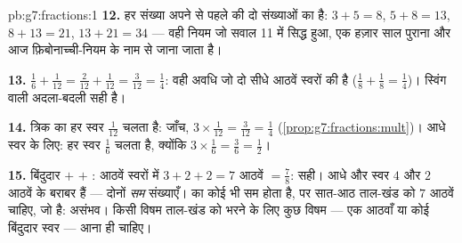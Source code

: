\begin{solution}{pb:g7:fractions:1}
\textbf{12.} हर संख्या अपने से पहले की दो संख्याओं का  है:
$3 + 5 = 8$, $5 + 8 = 13$, $8 + 13 = 21$, $13 + 21 = 34$ --- वही
नियम जो सवाल 11 में सिद्ध हुआ, एक हज़ार साल पुराना और आज
फ़िबोनाच्ची-नियम के नाम से जाना जाता है।

\textbf{13.} $\frac16 + \frac{1}{12} = \frac{2}{12} +
\frac{1}{12} = \frac{3}{12} = \frac14$: वही अवधि जो दो सीधे आठवें
स्वरों की है ($\frac18 + \frac18 = \frac14$)। स्विंग वाली
अदला-बदली सही है।

\textbf{14.} त्रिक का हर स्वर $\frac{1}{12}$ चलता है: जाँच,
$3 \times \frac{1}{12} = \frac{3}{12} = \frac14$
(\cref{prop:g7:fractions:mult})। आधे स्वर के लिए: हर स्वर $\frac16$
चलता है, क्योंकि $3 \times \frac16 = \frac36 = \frac12$।

\textbf{15.} बिंदुदार  $+$  $+$ : आठवें स्वरों में
$3 + 2 + 2 = 7$ आठवें $= \frac78$: सही। आधे और  स्वर $4$ और
$2$ आठवें के बराबर हैं --- दोनों \emph{सम} संख्याएँ। 
का कोई भी  सम होता है, पर सात-आठ ताल-खंड को $7$ आठवें चाहिए,
जो  है: असंभव। किसी विषम ताल-खंड को भरने के लिए कुछ
विषम --- एक आठवाँ या कोई बिंदुदार स्वर --- आना ही चाहिए।

\end{solution}
